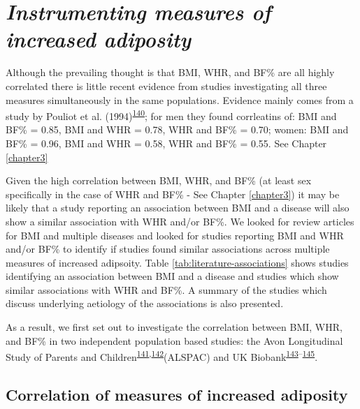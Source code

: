 \documentclass[11pt,twoside]{bristolthesis}
\begin{document}
\hypertarget{instrumenting-measures-of-increased-adiposity}{%
\section*{\texorpdfstring{\emph{Instrumenting measures of increased adiposity}}{Instrumenting measures of increased adiposity}}\label{instrumenting-measures-of-increased-adiposity}}

Although the prevailing thought is that BMI, WHR, and BF\% are all highly correlated there is little recent evidence from studies investigating all three measures simultaneously in the same populations. Evidence mainly comes from a study by Pouliot et al. (1994)\textsuperscript{\protect\hyperlink{ref-Pouliot1994}{140}}; for men they found corrleatins of: BMI and BF\% = 0.85, BMI and WHR = 0.78, WHR and BF\% = 0.70; women: BMI and BF\% = 0.96, BMI and WHR = 0.58, WHR and BF\% = 0.55. See Chapter \ref{chapter3}

Given the high correlation between BMI, WHR, and BF\% (at least sex specifically in the case of WHR and BF\% - See Chapter \ref{chapter3}) it may be likely that a study reporting an association between BMI and a disease will also show a similar association with WHR and/or BF\%. We looked for review articles for BMI and multiple diseases and looked for studies reporting BMI and WHR and/or BF\% to identify if studies found similar associations across multiple measures of increased adipsoity. Table \ref{tab:literature-associations} shows studies identifying an association between BMI and a disease and studies which show similar associations with WHR and BF\%. A summary of the studies which discuss underlying aetiology of the associations is also presented.

As a result, we first set out to investigate the correlation between BMI, WHR, and BF\% in two independent population based studies: the Avon Longitudinal Study of Parents and Children\textsuperscript{\protect\hyperlink{ref-Fraser2013}{141},\protect\hyperlink{ref-Boyd2013}{142}}(ALSPAC) and UK Biobank\textsuperscript{\protect\hyperlink{ref-Collins2012}{143}--\protect\hyperlink{ref-Sudlow2015}{145}}.

\hypertarget{correlation-of-measures-of-increased-adiposity}{%
\subsection{Correlation of measures of increased adiposity}\label{correlation-of-measures-of-increased-adiposity}}
\end{document}
